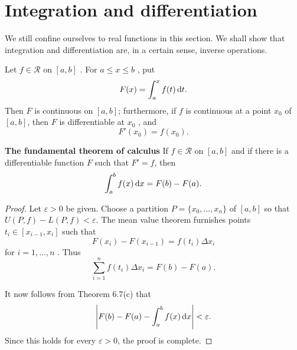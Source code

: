 \section{Integration and differentiation}

We still confine ourselves to real functions in this section. 
We shall show that integration and differentiation are, in a certain sense, inverse operations.

\begin{thm}
    \label{thm:6.20}
    Let $f \in \mathscr{R}$ on $[a,b]$ .
    For $a \leq x \leq b$ , put
    \begin{equation*}
        F(x) = \int_{a}^{x} f(t) \d t.
    \end{equation*}
    Then $F$ is continuous on $[a, b ]$;
    furthermore, if $f$ is continuous at a point $x_0$ of $[a, b ]$, 
    then $F$ is differentiable at $x_0$ , and
    \begin{equation*}
        F'(x_0) = f(x_0).
    \end{equation*}
\end{thm}

\begin{thm}
    \label{thm:6.21}
    \textbf{The fundamental theorem of calculus}
    If $f \in \mathscr{R}$ on $[a,b]$ 
    and if there is a differentiable function $F$
    such that $F' = f$, then
    \begin{equation*}
        \int_{a}^{b} f(x) \d x = F(b) - F(a).
    \end{equation*}
\end{thm}
\begin{proof}
    Let $\varepsilon > 0$ be given.
    Choose a partition $P = \{x_0,...,x_n\}$ of $[a,b]$ 
    so that $U(P,f) - L(P,f)<\varepsilon$.
    The mean value theorem furnishes points $t_i \in [x_{i-1}, x_i]$
    such that
    \begin{equation*}
        F(x_i) - F(x_{i-1}) = f(t_i) \Delta x_i
    \end{equation*}
    for $i = 1,...,n$ . Thus 
    \begin{equation*}
        \sum_{i=1}^{n} f(t_i) \Delta x_i = F(b) - F(a).
    \end{equation*}

    It now follows from Theorem 6.7(c) that
    \begin{equation*}
        \left| F(b) - F(a) - \int_{a}^{b} f(x) \d x \right|  < \varepsilon.
    \end{equation*}
    Since this holds for every $\varepsilon > 0$,
    the proof is complete.
\end{proof}

